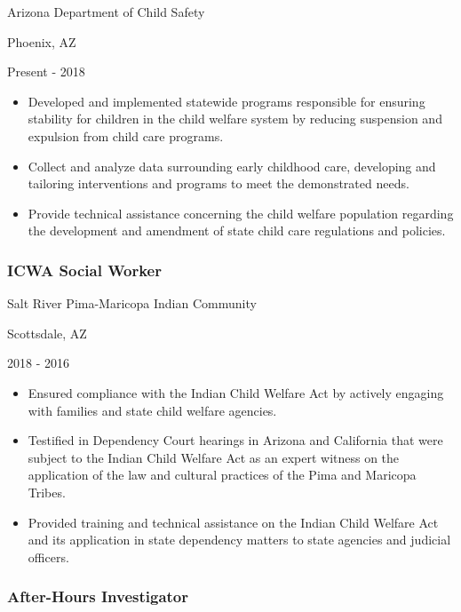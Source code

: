 \documentclass[
]{article}
\providecommand{\tightlist}{%
  \setlength{\itemsep}{0pt}\setlength{\parskip}{0pt}}
\begin{document}
Arizona Department of Child Safety

Phoenix, AZ

Present - 2018

\begin{itemize}
\tightlist
\item
  Developed and implemented statewide programs responsible for ensuring
  stability for children in the child welfare system by reducing
  suspension and expulsion from child care programs.
\item
  Collect and analyze data surrounding early childhood care, developing
  and tailoring interventions and programs to meet the demonstrated
  needs.
\item
  Provide technical assistance concerning the child welfare population
  regarding the development and amendment of state child care
  regulations and policies.
\end{itemize}

\hypertarget{icwa-social-worker}{%
\subsubsection{ICWA Social Worker}\label{icwa-social-worker}}

Salt River Pima-Maricopa Indian Community

Scottsdale, AZ

2018 - 2016

\begin{itemize}
\tightlist
\item
  Ensured compliance with the Indian Child Welfare Act by actively
  engaging with families and state child welfare agencies.
\item
  Testified in Dependency Court hearings in Arizona and California that
  were subject to the Indian Child Welfare Act as an expert witness on
  the application of the law and cultural practices of the Pima and
  Maricopa Tribes.
\item
  Provided training and technical assistance on the Indian Child Welfare
  Act and its application in state dependency matters to state agencies
  and judicial officers.
\end{itemize}

\hypertarget{after-hours-investigator}{%
\subsubsection{After-Hours
Investigator}\label{after-hours-investigator}}
\end{document}

